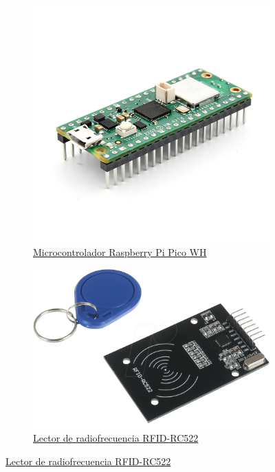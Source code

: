 \documentclass{article}
\begin{document}
\begin{figure}[H]
	\centering
	\begin{subfigure}[b]{0.45\textwidth}
		\includegraphics[width=\textwidth]{../images/picowh.png}
		\caption*{\href{https://www.raspberrypi.com/products/raspberry-pi-pico/}{Microcontrolador Raspberry Pi Pico WH}}
		\label{fig:picowh}
	\end{subfigure}
	\hfill
	\begin{subfigure}[b]{0.45\textwidth}
		\includegraphics[width=\textwidth]{../images/mfrc522.png}
		\caption*{\href{https://www.keyestudio.com/products/keyestudio-mfrc522-rfid-s50-fudan-card-ic-card-module-with-spi-port-for-arduino-uno-r3-mega-2560-r3}{Lector de radiofrecuencia RFID-RC522}}
		\label{fig:MFRC522}
	\end{subfigure}
\end{figure}
\end{document}
